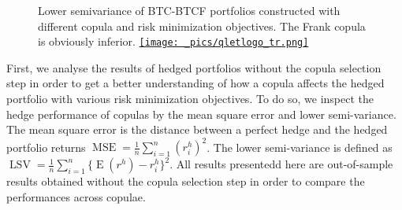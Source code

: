 \begin{figure}[t]
\begin{minipage}[t]{.475\textwidth}
  \caption{Lower semivariance of BTC-BTCF portfolios constructed with different copula and risk minimization objectives.
  The Frank copula is obviously inferior.
  \href{http://www.quantlet.com/}{\texttt{[image: \_pics/qletlogo\_tr.png]}} }
\label{fig:SLV_BTC}
\end{minipage}
\end{figure}
First, we analyse the results of hedged portfolios without the copula
selection step in order to get a better understanding of how a copula
affects the hedged portfolio with various risk minimization
objectives.
To do so, we inspect the hedge performance of copulas by
the mean square error and lower semi-variance.
The mean square error
is the distance between a perfect hedge and the hedged portfolio
returns $\operatorname{MSE}=\frac{1}{n}\sum_{i=1}^n(r^h_i)^2$. 
The lower semi-variance is defined as 
$\operatorname{LSV}=\frac{1}{n}\sum_{i=1}^n\{\operatorname{E}(r^h)-r^h_i\}^2$. 
All results presentedd here are out-of-sample results obtained without
the copula selection step in order to compare the performances across
copulae.  


